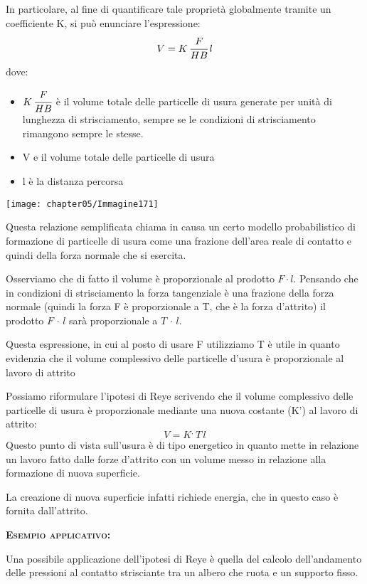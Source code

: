 In particolare, al fine di quantificare tale proprietà globalmente tramite un coefficiente K, si può enunciare l'espressione:
\[V = K\,\cfrac{F}{HB}\,l\]
dove:

\begin{minipage}{.55\textwidth}
\begin{itemize}
\item $K\,\cfrac{F}{HB}$ è il volume totale delle particelle di usura generate per unità di lunghezza di strisciamento, sempre se le condizioni di strisciamento rimangono sempre le stesse.
\item V e il volume totale delle particelle di usura
\item l è la distanza percorsa
\end{itemize}
\end{minipage}
\hfill
\begin{minipage}{.4\textwidth}
\centering
\texttt{[image: chapter05/Immagine171]}
\end{minipage}

Questa relazione semplificata chiama in causa un certo modello probabilistico di formazione di particelle di usura come una frazione dell'area reale di contatto e quindi della forza normale che si esercita.

Osserviamo che di fatto il volume è proporzionale al prodotto $F\cdot l$. Pensando che in condizioni di strisciamento la forza tangenziale è una frazione della forza normale (quindi la forza F è proporzionale a T, che è la forza d'attrito) il prodotto $F\,\cdot \,l$ sarà proporzionale a $T\,\cdot\,l$. 

Questa espressione, in cui al posto di usare F utilizziamo T è utile in quanto evidenzia che il volume complessivo delle particelle d'usura è proporzionale al lavoro di attrito

Possiamo riformulare l'ipotesi di Reye scrivendo che il volume complessivo delle particelle di usura è proporzionale mediante una nuova costante (K') al lavoro di attrito:
\[V = K^{,}\,T\,l\]
Questo punto di vista sull'usura è di tipo energetico in quanto mette in relazione un lavoro fatto dalle forze d'attrito con un volume messo in relazione alla formazione di nuova superficie.

La creazione di nuova superficie infatti richiede energia, che in questo caso è fornita dall'attrito.
	
	\begin{center}
	{\scshape {\bfseries Esempio applicativo:}}
	\end{center}
Una possibile applicazione dell'ipotesi di Reye è quella del calcolo dell'andamento delle pressioni al contatto strisciante tra un albero che ruota e un supporto fisso. 

